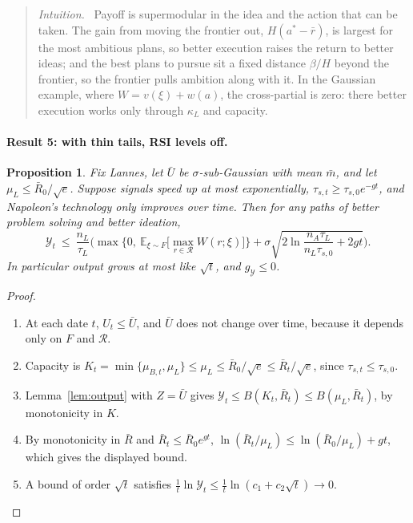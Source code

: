 \documentclass[11pt]{article}
\newcommand{\Nap}{\textcolor{nap}{Napoleon}}
\newcommand{\Lan}{\textcolor{lan}{Lannes}}
\newtheorem{proposition}{Proposition}
\theoremstyle{remark}
\newenvironment{intuition}{\begin{quote}\small\color{muted}\textit{Intuition.}\ }{\end{quote}}
\newcommand{\E}{\mathbb{E}}
\newcommand{\Ycal}{\mathcal{Y}}
\newcommand{\Rcal}{\mathcal{R}}
\begin{document}
\begin{intuition}
Payoff is supermodular in the idea and the action that can be taken. The gain from moving the frontier out, $H(a^*-\bar r)$, is largest for the most ambitious plans, so better execution raises the return to better ideas; and the best plans to pursue sit a fixed distance $\beta/H$ beyond the frontier, so the frontier pulls ambition along with it. In the Gaussian example, where $W=v(\xi)+w(a)$, the cross-partial is zero: there better execution works only through $\kappa_L$ and capacity.
\end{intuition}

\paragraph{Result 5: with thin tails, RSI levels off.}

\begin{proposition}\label{prop:thin}
Fix \Lan, let $\bar U$ be $\sigma$-sub-Gaussian with mean $\bar m$, and let $\mu_L\le\bar R_0/\sqrt e$. Suppose signals speed up at most exponentially, $\tau_{s,t}\ge\tau_{s,0}e^{-gt}$, and \Nap's technology only improves over time. Then for any paths of better problem solving and better ideation,
\[
\Ycal_t\ \le\ \frac{n_L}{\tau_L}\bigg(\max\Big\{0,\ \E_{\xi\sim F}\Big[\max_{r\in\Rcal}W(r;\xi)\Big]\Big\}+\sigma\sqrt{2\ln\frac{n_A\tau_L}{n_L\tau_{s,0}}+2gt}\bigg).
\]
In particular output grows at most like $\sqrt t$, and $g_{\Ycal}\le0$.
\end{proposition}

\begin{proof}
\begin{enumerate}
  \item At each date $t$, $U_t\le\bar U$, and $\bar U$ does not change over time, because it depends only on $F$ and $\Rcal$.
  \item Capacity is $K_t=\min\{\mu_{B,t},\mu_L\}\le\mu_L\le\bar R_0/\sqrt e\le\bar R_t/\sqrt e$, since $\tau_{s,t}\le\tau_{s,0}$.
  \item Lemma~\ref{lem:output} with $Z=\bar U$ gives $\Ycal_t\le B(K_t,\bar R_t)\le B(\mu_L,\bar R_t)$, by monotonicity in $K$.
  \item By monotonicity in $\bar R$ and $\bar R_t\le\bar R_0e^{gt}$, $\ln(\bar R_t/\mu_L)\le\ln(\bar R_0/\mu_L)+gt$, which gives the displayed bound.
  \item A bound of order $\sqrt t$ satisfies $\frac1t\ln\Ycal_t\le\frac1t\ln(c_1+c_2\sqrt t)\to0$. \qedhere
\end{enumerate}
\end{proof}
\end{document}
